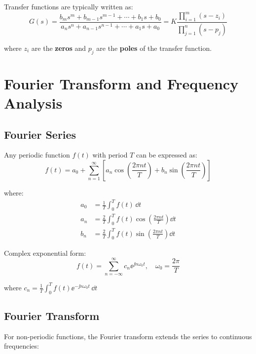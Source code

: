 Transfer functions are typically written as:
\begin{equation}
G(s) = \frac{b_ms^m + b_{m-1}s^{m-1} + \cdots + b_1s + b_0}{a_ns^n + a_{n-1}s^{n-1} + \cdots + a_1s + a_0} = K\frac{\prod_{i=1}^m (s-z_i)}{\prod_{j=1}^n (s-p_j)}
\end{equation}

where $z_i$ are the \textbf{zeros} and $p_j$ are the \textbf{poles} of the transfer function.

\chapter{Fourier Transform and Frequency Analysis}
\label{ch:fourier}

\section{Fourier Series}

Any periodic function $f(t)$ with period $T$ can be expressed as:
\begin{equation}
f(t) = a_0 + \sum_{n=1}^{\infty} \left[ a_n \cos\left(\frac{2\pi nt}{T}\right) + b_n \sin\left(\frac{2\pi nt}{T}\right) \right]
\end{equation}

where:
\begin{align}
a_0 &= \frac{1}{T} \int_0^T f(t) \, \dd t \\
a_n &= \frac{2}{T} \int_0^T f(t) \cos\left(\frac{2\pi nt}{T}\right) \dd t \\
b_n &= \frac{2}{T} \int_0^T f(t) \sin\left(\frac{2\pi nt}{T}\right) \dd t
\end{align}

Complex exponential form:
\begin{equation}
f(t) = \sum_{n=-\infty}^{\infty} c_n \ee^{\jj n \omega_0 t}, \quad \omega_0 = \frac{2\pi}{T}
\end{equation}

where $c_n = \frac{1}{T} \int_0^T f(t) \ee^{-\jj n \omega_0 t} \, \dd t$

\section{Fourier Transform}

For non-periodic functions, the Fourier transform extends the series to continuous frequencies:

